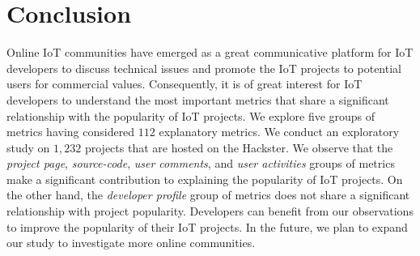 \section{Conclusion}\label{section:conclusion}

Online IoT communities have emerged as a great communicative platform for IoT developers to discuss technical issues and promote the IoT projects to potential users for commercial values. Consequently, it is of great interest for IoT developers to understand the most important metrics that share a significant relationship with the popularity of IoT projects.
We explore five groups of metrics having considered $112$ explanatory metrics. We conduct an exploratory study on $1,232$ projects that are hosted on the Hackster.
We observe that the {\em project page}, {\em source-code}, {\em user comments}, and {\em user activities} groups of metrics make a significant contribution to explaining the popularity of IoT projects. On the other hand, the {\em developer profile} group of metrics does not share a significant relationship with project popularity. 
Developers can benefit from our observations to improve the popularity of their IoT projects.
In the future, we plan to expand our study to investigate more online communities.